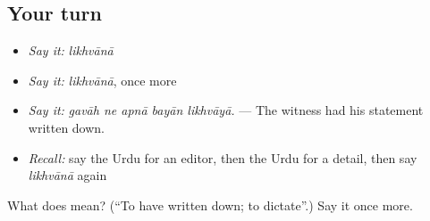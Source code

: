 \subsection*{Your turn}
\begin{itemize}
\raggedright
  \item \emph{Say it:} \emph{likhvānā}
  \item \emph{Say it:} \emph{likhvānā}, once more
  \item \emph{Say it:} \emph{gavāh ne apnā bayān likhvāyā.} — The witness had his statement written down.
  \item \emph{Recall:} say the Urdu for an editor, then the Urdu for a detail, then say \emph{likhvānā} again
\end{itemize}

\begin{tcolorbox}[breakable,colback=teal!4,colframe=teal!35!black,title={Before you move on}]
What does  mean? (\textquotedblleft{}To have written down; to dictate\textquotedblright{}.) Say it once more.
\end{tcolorbox}
